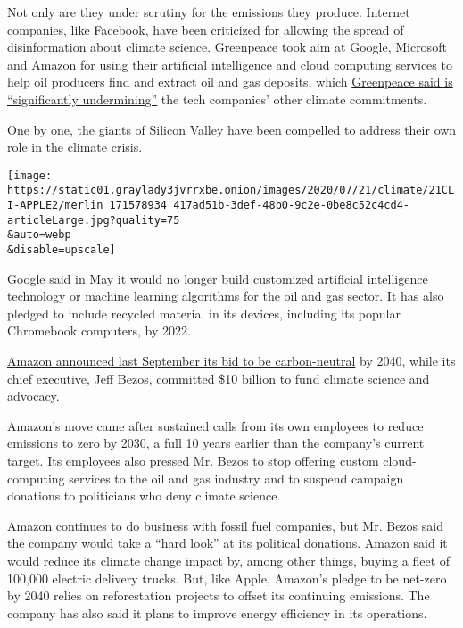 Not only are they under scrutiny for the emissions they produce.
Internet companies, like Facebook, have been criticized for allowing the
spread of disinformation about climate science. Greenpeace took aim at
Google, Microsoft and Amazon for using their artificial intelligence and
cloud computing services to help oil producers find and extract oil and
gas deposits, which
\href{https://www.greenpeace.org/usa/reports/oil-in-the-cloud/}{Greenpeace
said is ``significantly undermining''} the tech companies' other climate
commitments.

One by one, the giants of Silicon Valley have been compelled to address
their own role in the climate crisis.

\texttt{[image: https://static01.graylady3jvrrxbe.onion/images/2020/07/21/climate/21CLI-APPLE2/merlin\_171578934\_417ad51b-3def-48b0-9c2e-0be8c52c4cd4-articleLarge.jpg?quality=75\\\&auto=webp\\\&disable=upscale]}

\href{https://onezero.medium.com/google-says-it-will-not-build-custom-a-i-for-oil-and-gas-extraction-72d1f71f42c8}{Google
said in May} it would no longer build customized artificial intelligence
technology or machine learning algorithms for the oil and gas sector. It
has also pledged to include recycled material in its devices, including
its popular Chromebook computers, by 2022.

\href{https://www.nytimes3xbfgragh.onion/2019/09/19/technology/amazon-carbon-neutral.html?searchResultPosition=1}{Amazon
announced last September its bid to be carbon-neutral} by 2040, while
its chief executive, Jeff Bezos, committed \$10 billion to fund climate
science and advocacy.

Amazon's move came after sustained calls from its own employees to
reduce emissions to zero by 2030, a full 10 years earlier than the
company's current target. Its employees also pressed Mr. Bezos to stop
offering custom cloud-computing services to the oil and gas industry and
to suspend campaign donations to politicians who deny climate science.

Amazon continues to do business with fossil fuel companies, but Mr.
Bezos said the company would take a ``hard look'' at its political
donations. Amazon said it would reduce its climate change impact by,
among other things, buying a fleet of 100,000 electric delivery trucks.
But, like Apple, Amazon's pledge to be net-zero by 2040 relies on
reforestation projects to offset its continuing emissions. The company
has also said it plans to improve energy efficiency in its operations.

